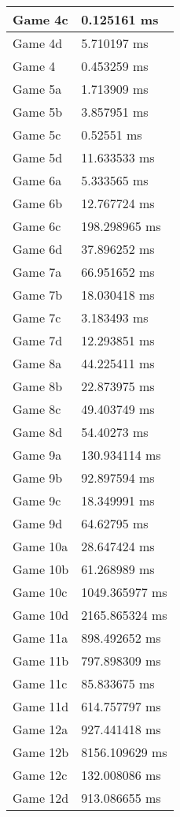\begin{multicols}{2}
\begin{tabular}{|l|l|}
	Game 4c & 0.125161 ms \\ \hline
	Game 4d & 5.710197 ms \\ \hline
	Game 4 & 0.453259 ms \\ \hline
	Game 5a & 1.713909 ms \\ \hline
	Game 5b & 3.857951 ms \\ \hline
	Game 5c & 0.52551 ms \\ \hline
	Game 5d & 11.633533 ms \\ \hline
	Game 6a & 5.333565 ms \\ \hline
	Game 6b & 12.767724 ms \\ \hline
	Game 6c & 198.298965 ms \\ \hline
	Game 6d & 37.896252 ms \\ \hline
	Game 7a & 66.951652 ms \\ \hline
	Game 7b & 18.030418 ms \\ \hline
	Game 7c & 3.183493 ms \\ \hline
	Game 7d & 12.293851 ms \\ \hline
	Game 8a & 44.225411 ms \\ \hline
	Game 8b & 22.873975 ms \\ \hline
	Game 8c & 49.403749 ms \\ \hline
	Game 8d & 54.40273 ms \\ \hline
	Game 9a & 130.934114 ms \\ \hline
	Game 9b & 92.897594 ms \\ \hline
	Game 9c & 18.349991 ms \\ \hline
	Game 9d & 64.62795 ms \\ \hline
	Game 10a & 28.647424 ms \\ \hline
	Game 10b & 61.268989 ms \\ \hline
	Game 10c & 1049.365977 ms \\ \hline
	Game 10d & 2165.865324 ms \\ \hline
	Game 11a & 898.492652 ms \\ \hline
	Game 11b & 797.898309 ms \\ \hline
	Game 11c & 85.833675 ms \\ \hline
	Game 11d & 614.757797 ms \\ \hline
	Game 12a & 927.441418 ms \\ \hline
	Game 12b & 8156.109629 ms \\ \hline
	Game 12c & 132.008086 ms \\ \hline
	Game 12d & 913.086655 ms \\ \hline

\end{tabular}
\end{multicols}
